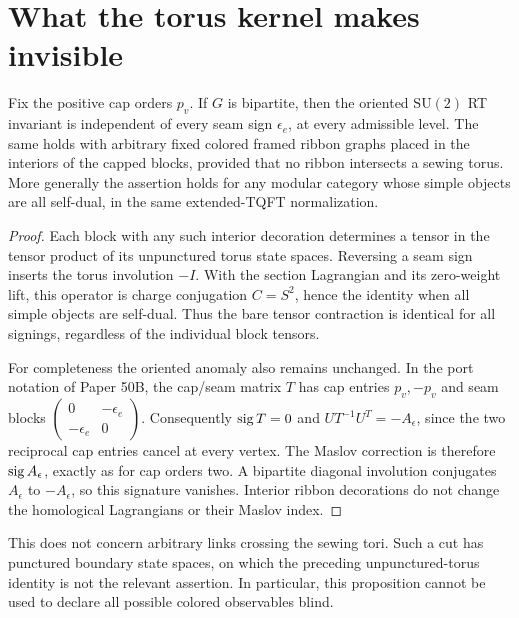 \section{What the torus kernel makes invisible}
\begin{proposition}
Fix the positive cap orders \(p_v\). If \(G\) is bipartite, then the
oriented \(\mathrm{SU}(2)\) RT invariant is independent of every seam
sign \(\epsilon_e\), at every admissible level. The same holds with
arbitrary fixed colored framed ribbon graphs placed in the interiors of
the capped blocks, provided that no ribbon intersects a sewing torus.
More generally the assertion holds for any modular category whose simple
objects are all self-dual, in the same extended-TQFT normalization.
\end{proposition}
\begin{proof}
Each block with any such interior decoration determines a tensor in the
tensor product of its unpunctured torus state spaces. Reversing a seam sign
inserts the torus involution \(-I\). With the section Lagrangian and its
zero-weight lift, this operator is charge conjugation \(C=S^2\), hence
the identity when all simple objects are self-dual. Thus the bare tensor
contraction is identical for all signings, regardless of the individual
block tensors.

For completeness the oriented anomaly also remains unchanged. In the
port notation of Paper 50B, the cap/seam matrix \(T\) has cap entries
\(p_v,-p_v\) and seam blocks
\(\left(\begin{smallmatrix}0&-\epsilon_e\\-\epsilon_e&0\end{smallmatrix}\right)\).
Consequently \(\operatorname{sig} T=0\) and
\(UT^{-1}U^T=-A_\epsilon\), since the two reciprocal cap entries
cancel at every vertex. The Maslov correction is therefore
\(\operatorname{sig} A_\epsilon\), exactly as for cap orders two. A bipartite
diagonal involution conjugates \(A_\epsilon\) to \(-A_\epsilon\),
so this signature vanishes. Interior ribbon decorations do not change
the homological Lagrangians or their Maslov index.
\end{proof}
\begin{remark}
This does not concern arbitrary links crossing the sewing tori. Such a
cut has punctured boundary state spaces, on which the preceding
unpunctured-torus identity is not the relevant assertion. In particular,
this proposition cannot be used to declare all possible colored
observables blind.
\end{remark}


